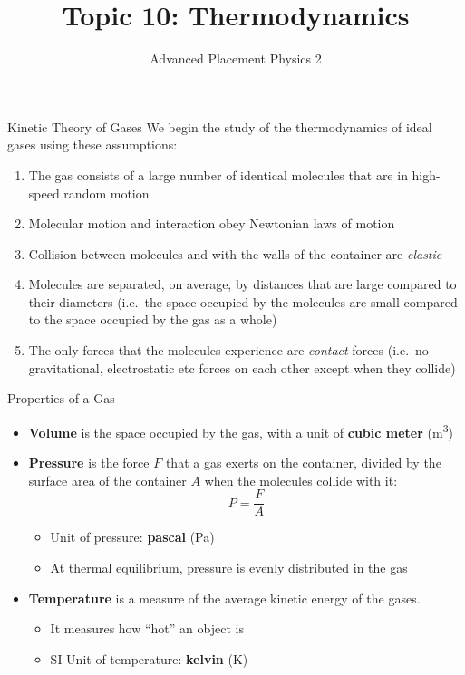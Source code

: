 \documentclass[12pt,aspectratio=169]{beamer}
\title{Topic 10: Thermodynamics}
\subtitle{Advanced Placement Physics 2}
\begin{document}
\begin{frame}
  \maketitle
\end{frame}



\begin{frame}{Kinetic Theory of Gases}
  We begin the study of the thermodynamics of ideal gases using these
  assumptions:
  \begin{enumerate}
  \item The gas consists of a large number of identical molecules that are in
    high-speed random motion
  \item Molecular motion and interaction obey Newtonian laws of motion
  \item Collision between molecules and with the walls of the container are
    \emph{elastic}
  \item Molecules are separated, on average, by distances that are large
    compared to their diameters (i.e.\ the space occupied by the molecules are
    small compared to the space occupied by the gas as a whole)
  \item The only forces that the molecules experience are \emph{contact} forces
    (i.e.\ no gravitational, electrostatic etc forces on each other except when
    they collide)
  \end{enumerate}
\end{frame}



\begin{frame}{Properties of a Gas}
  \begin{itemize}
  \item\textbf{Volume} is the space occupied by the gas, with a unit of
    \textbf{cubic meter} (\si{\metre\cubed})
  \item\textbf{Pressure} is the force $F$ that a gas exerts on the container,
    divided by the surface area of the container $A$ when the molecules collide
    with it:
    \begin{displaymath}
        P=\frac FA
    \end{displaymath}
    \begin{itemize}
    \item\vspace{-.2in}Unit of pressure: \textbf{pascal} (\si{\pascal})
    \item At thermal equilibrium, pressure is evenly distributed in the gas
    \end{itemize}
  \item\textbf{Temperature} is a measure of the average kinetic energy of the
    gases.
    \begin{itemize}
    \item It measures how ``hot'' an object is
    \item SI Unit of temperature: \textbf{kelvin} (\si{\kelvin})
    \end{itemize}
  \end{itemize}
\end{frame}
\end{document}

